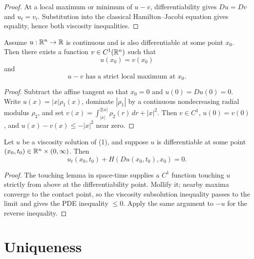 \begin{proof}
\sketch At a local maximum or minimum of $u-v$, differentiability gives $Du=Dv$ and $u_t=v_t$. Substitution into the classical Hamilton--Jacobi equation gives equality, hence both viscosity inequalities.
\end{proof}

\begin{lemma}
\label{lem:touching-by-c1-function}
Assume $u : \mathbb{R}^n \to \mathbb{R}$ is continuous and is also differentiable at some point $x_0$. Then there exists a function $v \in C^1(\mathbb{R}^n)$ such that
\[
u(x_0) = v(x_0)
\tag{18}
\]
and
\[
u - v \text{ has a strict local maximum at } x_0.
\tag{19}
\]
\end{lemma}

\begin{proof}
\sketch Subtract the affine tangent so that $x_0=0$ and $u(0)=Du(0)=0$. Write $u(x)=|x|\rho_1(x)$, dominate $|\rho_1|$ by a continuous nondecreasing radial modulus $\rho_2$, and set $v(x)=\int_{|x|}^{2|x|}\rho_2(r)\,dr+|x|^2$. Then $v\in C^1$, $u(0)=v(0)$, and $u(x)-v(x)\leq-|x|^2$ near zero.
\end{proof}

\begin{theorem}
\label{thm:consistency-viscosity-solutions}

Let $u$ be a viscosity solution of (1), and suppose $u$ is differentiable at some point $(x_0, t_0) \in \mathbb{R}^n \times (0, \infty)$. Then
\[
u_t(x_0, t_0) + H(Du(x_0, t_0), x_0) = 0.
\]
\end{theorem}

\begin{proof}
\sketch The touching lemma in space-time supplies a $C^1$ function touching $u$ strictly from above at the differentiability point. Mollify it; nearby maxima converge to the contact point, so the viscosity subsolution inequality passes to the limit and gives the PDE inequality $\leq0$. Apply the same argument to $-u$ for the reverse inequality.
\end{proof}

\section{Uniqueness}
\label{sec:hj-uniqueness}

